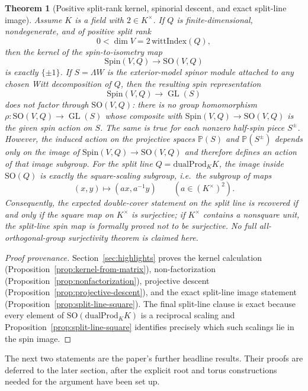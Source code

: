 \documentclass{birkjour}
\theoremstyle{plain}
\newtheorem{theorem}{Theorem}[section]
\theoremstyle{definition}
\theoremstyle{remark}
\newcommand{\Spin}{\mathrm{Spin}}
\newcommand{\SO}{\mathrm{SO}}
\newcommand{\dualProd}{\mathrm{dualProd}}
\newcommand{\wedgeW}{\Lambda W}
\begin{document}
\begin{theorem}[Positive split-rank kernel, spinorial descent, and exact split-line image]
\label{thm:kernel-nonfactor-split-line}
Assume $K$ is a field with $2\in K^\times$. If $Q$ is finite-dimensional,
nondegenerate, and of positive split rank
\[
  0<\dim V = 2\,\mathrm{wittIndex}(Q),
\]
then the kernel of the spin-to-isometry map
\[
  \Spin(V,Q) \to \SO(V,Q)
\]
is exactly $\{\pm1\}$. If $S=\wedgeW$ is the exterior-model spinor module
attached to any chosen Witt decomposition of $Q$, then the resulting spin
representation
\[
  \Spin(V,Q) \to \operatorname{GL}(S)
\]
does not factor through $\SO(V,Q)$: there is no group homomorphism
$\rho:\SO(V,Q)\to \operatorname{GL}(S)$ whose composite with
$\Spin(V,Q)\to\SO(V,Q)$ is the given spin action on $S$. The same is true for
each nonzero half-spin piece $S^\pm$. However, the induced action on the
projective spaces $\mathbb{P}(S)$ and $\mathbb{P}(S^\pm)$ depends only on the
image of $\Spin(V,Q)\to\SO(V,Q)$ and therefore defines an action of that image
subgroup. For the split line $Q=\dualProd_K K$, the image inside $\SO(Q)$ is
exactly the square-scaling subgroup, i.e.\ the subgroup of maps
\[
  (x,y)\longmapsto (a x, a^{-1} y)
  \qquad (a\in (K^\times)^2).
\]
Consequently, the expected double-cover statement on the split line is recovered
if and only if the square map on $K^\times$ is surjective; if $K^\times$
contains a nonsquare unit, the split-line spin map is formally proved not to be
surjective. No full all-orthogonal-group surjectivity theorem is claimed here.
\end{theorem}

\begin{proof}[Proof provenance]
Section~\ref{sec:highlights} proves the kernel calculation
(Proposition~\ref{prop:kernel-from-matrix}), non-factorization
(Proposition~\ref{prop:nonfactorization}), projective descent
(Proposition~\ref{prop:projective-descent}), and the exact split-line image
statement (Proposition~\ref{prop:split-line-square}). The final split-line
clause is exact because every element of $\SO(\dualProd_K K)$ is a reciprocal
scaling and Proposition~\ref{prop:split-line-square} identifies precisely which
such scalings lie in the spin image.
\end{proof}

The next two statements are the paper's further headline results. Their proofs
are deferred to the later section, after the explicit root and torus
constructions needed for the argument have been set up.
\end{document}
